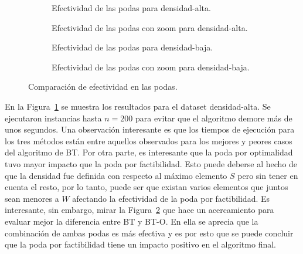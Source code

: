 \documentclass[10pt,a4paper]{article}
\begin{document}
\begin{figure}
    \centering
    \begin{subfigure}{0.45\linewidth}
        \centering
        
        \caption{Efectividad de las podas para densidad-alta.}
        \label{fig:bt-podas-alta}
    \end{subfigure}
    \begin{subfigure}{0.45\linewidth}
        \centering
        
        \caption{Efectividad de las podas con zoom para densidad-alta. }
        \label{fig:bt-podas-alta-zoom}
    \end{subfigure}
    \begin{subfigure}{0.45\linewidth}
        \centering
        
        \caption{Efectividad de las podas para densidad-baja.}
        \label{fig:bt-podas-baja}
    \end{subfigure}
    \begin{subfigure}{0.45\linewidth}
        \centering
        
        \caption{Efectividad de las podas con zoom para densidad-baja. }
        \label{fig:bt-podas-baja-zoom}
    \end{subfigure}
    \caption{Comparación de efectividad en las podas.}
    \label{fig:bt-podas}
\end{figure}

En la Figura~\ref{fig:bt-podas-alta} se muestra los resultados para el dataset densidad-alta. Se ejecutaron instancias hasta $n=200$ para evitar que el algoritmo demore más de unos segundos. Una observación interesante es que los tiempos de ejecución para los tres métodos están entre aquellos observados para los mejores y peores casos del algoritmo de BT. Por otra parte, es interesante que la poda por optimalidad tuvo mayor impacto que la poda por factibilidad. Esto puede deberse al hecho de que la densidad fue definida con respecto al máximo elemento $S$ pero sin tener en cuenta el resto, por lo tanto, puede ser que existan varios elementos que juntos sean menores a $W$ afectando la efectividad de la poda por factibilidad. Es interesante, sin embargo, mirar la Figura~\ref{fig:bt-podas-alta-zoom} que hace un acercamiento para evaluar mejor la diferencia entre BT y BT-O. En ella se aprecia que la combinación de ambas podas es más efectiva y es por esto que se puede concluir que la poda por factibilidad tiene un impacto positivo en el algoritmo final.
\end{document}

